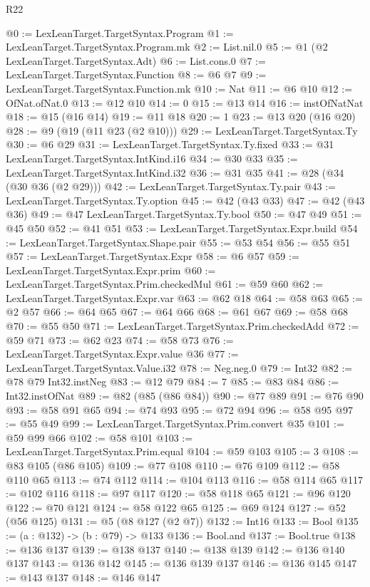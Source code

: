 \begin{lexlean}{R22}
\begin{coremodule}
@0 := LexLeanTarget.TargetSyntax.Program
@1 := LexLeanTarget.TargetSyntax.Program.mk
@2 := List.nil.{0}
@5 := @1 (@2 LexLeanTarget.TargetSyntax.Adt)
@6 := List.cons.{0}
@7 := LexLeanTarget.TargetSyntax.Function
@8 := @6 @7
@9 := LexLeanTarget.TargetSyntax.Function.mk
@10 := Nat
@11 := @6 @10
@12 := OfNat.ofNat.{0}
@13 := @12 @10
@14 := 0
@15 := @13 @14
@16 := instOfNatNat
@18 := @15 (@16 @14)
@19 := @11 @18
@20 := 1
@23 := @13 @20 (@16 @20)
@28 := @9 (@19 (@11 @23 (@2 @10)))
@29 := LexLeanTarget.TargetSyntax.Ty
@30 := @6 @29
@31 := LexLeanTarget.TargetSyntax.Ty.fixed
@33 := @31 LexLeanTarget.TargetSyntax.IntKind.i16
@34 := @30 @33
@35 := LexLeanTarget.TargetSyntax.IntKind.i32
@36 := @31 @35
@41 := @28 (@34 (@30 @36 (@2 @29)))
@42 := LexLeanTarget.TargetSyntax.Ty.pair
@43 := LexLeanTarget.TargetSyntax.Ty.option
@45 := @42 (@43 @33)
@47 := @42 (@43 @36)
@49 := @47 LexLeanTarget.TargetSyntax.Ty.bool
@50 := @47 @49
@51 := @45 @50
@52 := @41 @51
@53 := LexLeanTarget.TargetSyntax.Expr.build
@54 := LexLeanTarget.TargetSyntax.Shape.pair
@55 := @53 @54
@56 := @55 @51
@57 := LexLeanTarget.TargetSyntax.Expr
@58 := @6 @57
@59 := LexLeanTarget.TargetSyntax.Expr.prim
@60 := LexLeanTarget.TargetSyntax.Prim.checkedMul
@61 := @59 @60
@62 := LexLeanTarget.TargetSyntax.Expr.var
@63 := @62 @18
@64 := @58 @63
@65 := @2 @57
@66 := @64 @65
@67 := @64 @66
@68 := @61 @67
@69 := @58 @68
@70 := @55 @50
@71 := LexLeanTarget.TargetSyntax.Prim.checkedAdd
@72 := @59 @71
@73 := @62 @23
@74 := @58 @73
@76 := LexLeanTarget.TargetSyntax.Expr.value @36
@77 := LexLeanTarget.TargetSyntax.Value.i32
@78 := Neg.neg.{0}
@79 := Int32
@82 := @78 @79 Int32.instNeg
@83 := @12 @79
@84 := 7
@85 := @83 @84
@86 := Int32.instOfNat
@89 := @82 (@85 (@86 @84))
@90 := @77 @89
@91 := @76 @90
@93 := @58 @91 @65
@94 := @74 @93
@95 := @72 @94
@96 := @58 @95
@97 := @55 @49
@99 := LexLeanTarget.TargetSyntax.Prim.convert @35
@101 := @59 @99 @66
@102 := @58 @101
@103 := LexLeanTarget.TargetSyntax.Prim.equal
@104 := @59 @103
@105 := 3
@108 := @83 @105 (@86 @105)
@109 := @77 @108
@110 := @76 @109
@112 := @58 @110 @65
@113 := @74 @112
@114 := @104 @113
@116 := @58 @114 @65
@117 := @102 @116
@118 := @97 @117
@120 := @58 @118 @65
@121 := @96 @120
@122 := @70 @121
@124 := @58 @122 @65
@125 := @69 @124
@127 := @52 (@56 @125)
@131 := @5 (@8 @127 (@2 @7))
@132 := Int16
@133 := Bool
@135 := (a : @132) -> (b : @79) -> @133
@136 := Bool.and
@137 := Bool.true
@138 := @136 @137
@139 := @138 @137
@140 := @138 @139
@142 := @136 @140 @137
@143 := @136 @142
@145 := @136 @139 @137
@146 := @136 @145
@147 := @143 @137
@148 := @146 @147

\end{coremodule}
\end{lexlean}
